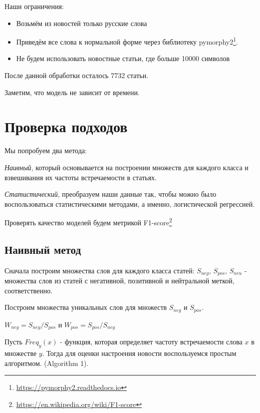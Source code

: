 \documentclass[12pt]{article}
\begin{document}
        Наши ограничения:
        \begin{itemize}
            \item Возьмём из новостей только русские слова
            \item Приведём все слова к нормальной форме через библиотеку pymorphy2\footnote{\href{https://pymorphy2.readthedocs.io}{https://pymorphy2.readthedocs.io}}.
            \item Не будем использовать новостные статьи, где больше 10000 символов
        \end{itemize}

        После данной обработки осталось 7732 статьи.
        
        Заметим, что модель не зависит от времени.

    \section{Проверка подходов}
        Мы попробуем два метода: 
        
        \textit{Наивный}, который основывается на построении множеств для каждого класса и взвешивания их 
        частоты встречаемости в статьях. 
        
        \textit{Статистический}, преобразуем наши данные так, чтобы можно было 
        воспользоваться статистическими методами, а именно, логистической регрессией.

        Проверять качество моделей будем метрикой F1-score\footnote{\href{https://en.wikipedia.org/wiki/F1\_score}{https://en.wikipedia.org/wiki/F1-score}}

        \subsection{Наивный метод}
            Сначала построим множества слов для каждого класса статей: $S_{neg}$,
            $S_{pos}$, $S_{neu}$ - множества слов из статей с негативной, 
            позитивной и нейтральной меткой, соответственно.

            Построим множества уникальных слов для множеств $S_{neg}$ и $S_{pos}$.
            \begin{center}
                $W_{neg} = S_{neg} / S_{pos}$ и $W_{pos} = S_{pos} / S_{neg}$
            \end{center}

            Пусть $Freq_y(x)$ - функция, которая определяет частоту встречаемости слова $x$
            в множестве $y$. Тогда для оценки настроения новости воспользуемся простым алгоритмом.
            (Algorithm 1). 
            
\end{document}
